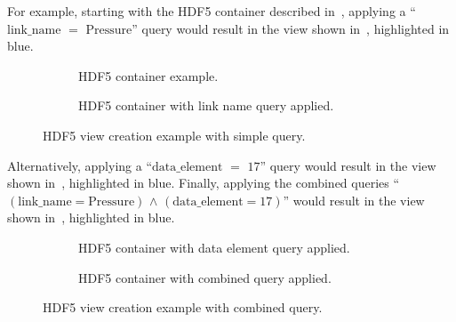 


For example, starting with the HDF5 container described in~,
applying a ``$\mathrm{link\_name}$ $\mathrm{=}$ $\mathrm{Pressure}$''
query would result in the view shown in~, highlighted in blue.
\begin{figure}
\begin{subfigure}[b]{.49\linewidth}
\centering
\resizebox{\textwidth}{!}{
  
}
\caption{HDF5 container example.}
\label{fig:hdf5_view1}
\end{subfigure}
\hfill
\begin{subfigure}[b]{.49\linewidth}
\centering
\resizebox{\textwidth}{!}{
  
}
\caption{HDF5 container with link name query applied.}
\label{fig:hdf5_view2}
\end{subfigure}
\caption{HDF5 view creation example with simple query.}
\end{figure}

Alternatively, applying a ``$\mathrm{data\_element}$ $\mathrm{=}$ $\mathrm{17}$''
query would result in the view shown in~, highlighted in blue.
Finally, applying the combined queries ``$\mathrm{(link\_name = Pressure)}$
$\mathrm{\land}$ $\mathrm{(data\_element = 17)}$''
would result in the view shown in~, highlighted in blue.

\begin{figure}
\begin{subfigure}[b]{.49\linewidth}
\centering
\resizebox{\textwidth}{!}{
  
}
\caption{HDF5 container with data element query applied.}
\label{fig:hdf5_view3}
\end{subfigure}
\hfill
\begin{subfigure}[b]{.49\linewidth}
\centering
\resizebox{\textwidth}{!}{
  
}
\caption{HDF5 container with combined query applied.}
\label{fig:hdf5_view4}
\end{subfigure}
\caption{HDF5 view creation example with combined query.}
\vspace{-20pt}
\end{figure}

